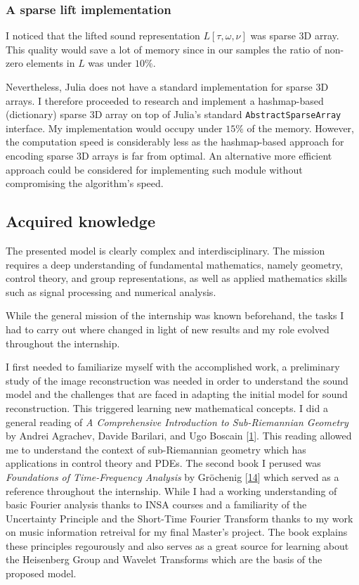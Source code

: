 \documentclass[american,]{article}
\theoremstyle{definition}
\theoremstyle{definition}
\theoremstyle{definition}
\theoremstyle{remark}
\begin{document}
\hypertarget{a-sparse-lift-implementation}{%
\subsubsection{A sparse lift implementation}\label{a-sparse-lift-implementation}}

I noticed that the lifted sound representation \(L[\tau,\omega,\nu]\) was sparse 3D array.
This quality would save a lot of memory since in our samples the ratio of non-zero
elements in \(L\) was under \(10\%\).

Nevertheless, Julia does not have a standard implementation for sparse 3D arrays.
I therefore proceeded to research and implement a hashmap-based (dictionary) sparse 3D array
on top of Julia's standard \texttt{AbstractSparseArray} interface.
My implementation would occupy under \(15\%\) of the memory.
However, the computation speed is considerably less as the hashmap-based approach
for encoding sparse 3D arrays is far from optimal.
An alternative more efficient approach could be considered for implementing such module
without compromising the algorithm's speed.

\hypertarget{acquired-knowledge}{%
\subsection{Acquired knowledge}\label{acquired-knowledge}}

The presented model is clearly complex and interdisciplinary.
The mission requires a deep understanding of fundamental mathematics,
namely geometry, control theory, and group representations,
as well as applied mathematics skills such as
signal processing and numerical analysis.

While the general mission of the internship was known beforehand,
the tasks I had to carry out where changed in light of new results
and my role evolved throughout the internship.

I first needed to familiarize myself with the accomplished work,
a preliminary study of the image reconstruction was needed
in order to understand the sound model and the challenges that are
faced in adapting the initial model for sound reconstruction.
This triggered learning new mathematical concepts.
I did a general reading of \emph{A Comprehensive Introduction to Sub-Riemannian Geometry}
by Andrei Agrachev, Davide Barilari, and Ugo Boscain {[}\protect\hyperlink{ref-subriemannian}{1}{]}.
This reading allowed me to understand the context of sub-Riemannian geometry
which has applications in control theory and PDEs.
The second book I perused was \emph{Foundations of Time-Frequency Analysis} by Gröchenig {[}\protect\hyperlink{ref-grochenig2001}{14}{]}
which served as a reference throughout the internship.
While I had a working understanding of basic Fourier analysis thanks to INSA courses
and a familiarity of the Uncertainty Principle and the Short-Time Fourier Transform
thanks to my work on music information retreival for my final Master's project.
The book explains these principles regourously and also serves as a great source
for learning about the Heisenberg Group and Wavelet Transforms which are the basis
of the proposed model.
\end{document}
